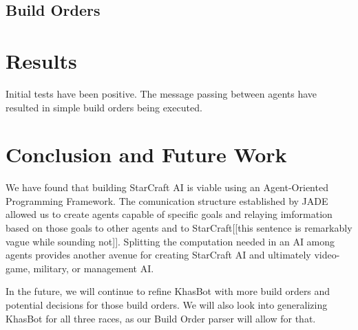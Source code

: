 \documentclass[letterpaper]{article}
\begin{document}
\subsection{Build Orders}

\section{Results}
Initial tests have been positive.  The message passing between agents have resulted in simple build orders being executed.

\section{Conclusion and Future Work}
We have found that building StarCraft AI is viable using an Agent-Oriented Programming Framework.  The comunication structure established by JADE allowed us to create agents capable of specific goals and relaying imformation based on those goals to other agents and to StarCraft[[this sentence is remarkably vague while sounding not]].  Splitting the computation needed in an AI among agents provides another avenue for creating StarCraft AI and ultimately video-game, military, or management AI.

In the future, we will continue to refine KhasBot with more build orders and potential decisions for those build orders.  We will also look into generalizing KhasBot for all three races, as our Build Order parser will allow for that.
\end{document}
